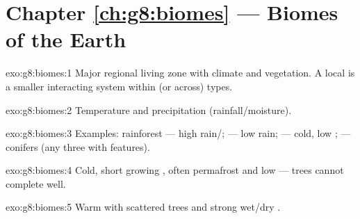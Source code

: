 \section*{Chapter \ref{ch:g8:biomes} --- Biomes of the Earth}

\begin{solution}{exo:g8:biomes:1}
Major regional living zone with  climate and vegetation.
A local  is a smaller interacting system within (or across)
 types.
\end{solution}

\begin{solution}{exo:g8:biomes:2}
Temperature and precipitation (rainfall/moisture).
\end{solution}

\begin{solution}{exo:g8:biomes:3}
Examples: rainforest --- high rain/;  --- low rain;
 --- cold, low ;  --- conifers (any three with features).
\end{solution}

\begin{solution}{exo:g8:biomes:4}
Cold, short growing , often permafrost and low  --- trees
cannot complete  well.
\end{solution}

\begin{solution}{exo:g8:biomes:5}
Warm  with scattered trees and strong wet/dry .
\end{solution}

